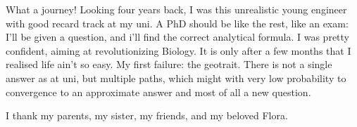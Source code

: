 %
\label{sec:acknowledgement}


What a journey! Looking four years back, I was this unrealistic young engineer with good recard track at my uni. A PhD should be like the rest, like an exam: I'll be given a question, and i'll find the correct analytical formula. 
%
I was pretty confident, aiming at revolutionizing Biology. It is only after a few months that I realised life ain't so easy.
% 
My first failure: the geotrait. There is not a single answer as at uni, but multiple paths, which might with very low probability to convergence to an approximate answer and most of all a new question.
% 

I thank my parents, my sister, my friends, and my beloved Flora.
